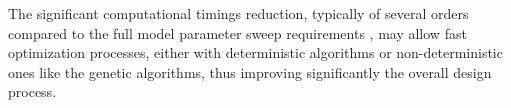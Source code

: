 \par The significant computational timings reduction, typically of several orders compared to the full model parameter sweep requirements \cite{SelleriEdlingerDDMOR}, may allow fast optimization processes, either with deterministic algorithms or non-deterministic ones like the genetic algorithms, thus improving significantly the overall design process.




